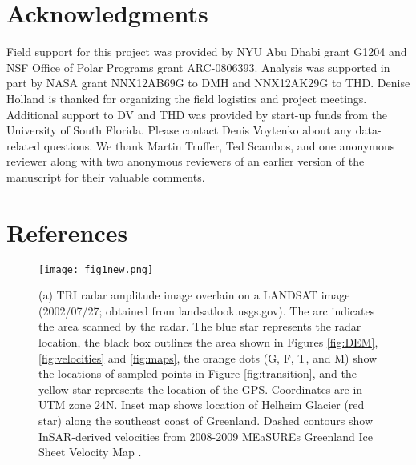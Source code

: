



\section{Acknowledgments}
Field support for this project was provided by NYU Abu Dhabi grant G1204 and NSF Office of Polar Programs grant ARC-0806393.  Analysis was supported in part by NASA grant NNX12AB69G to DMH and NNX12AK29G to THD.  Denise Holland is thanked for organizing the field logistics and project meetings. Additional support to DV and THD was provided by start-up funds from the University of South Florida. Please contact Denis Voytenko about any data-related questions. We thank Martin Truffer, Ted Scambos, and one anonymous reviewer along with two anonymous reviewers of an earlier version of the manuscript for their valuable comments.



\section{References}

% 
% 
% 
\newpage

\begin{figure}
\centering
\texttt{[image: fig1new.png]}
\caption[(a) TRI radar amplitude image overlain on a LANDSAT image (2002/07/27; obtained from landsatlook.usgs.gov).]{(a) TRI radar amplitude image overlain on a LANDSAT image (2002/07/27; obtained from landsatlook.usgs.gov). The arc indicates the area scanned by the radar. The blue star represents the radar location, the black box outlines the area shown in Figures \ref{fig:DEM}, \ref{fig:velocities} and \ref{fig:maps}, the orange dots (G, F, T, and M) show the locations of sampled points in Figure \ref{fig:transition}, and the yellow star represents the location of the GPS. Coordinates are in UTM zone 24N. Inset map shows location of Helheim Glacier (red star) along the southeast coast of Greenland. Dashed contours show InSAR-derived velocities from 2008-2009 MEaSUREs Greenland Ice Sheet Velocity Map \citep{joughin2010measures,joughin2010greenland}.}
\label{fig:sitelocation}
\end{figure}

